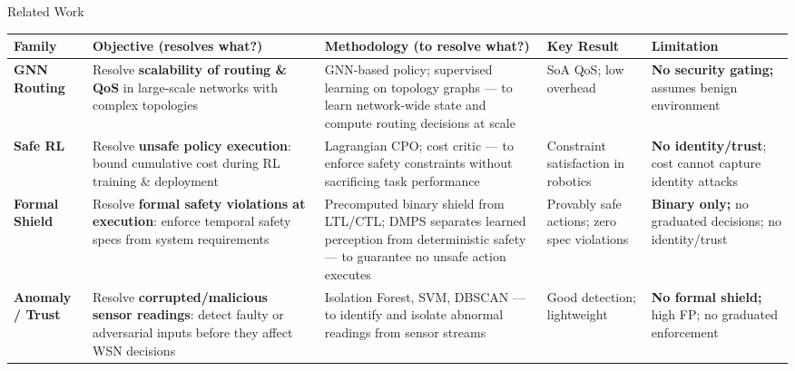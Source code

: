 \documentclass[aspectratio=169,10pt]{beamer}
\begin{document}
\begin{frame}[t,shrink=30]{Related Work}{}
  \centering
  \scriptsize
  \renewcommand{\arraystretch}{1.2}
  \begin{tabular}{p{1.8cm}|p{2.8cm}|p{2.8cm}|p{1.7cm}|p{2.0cm}}
    \toprule
    \textbf{Family} & \textbf{Objective} (resolves what?) & \textbf{Methodology} (to resolve what?) & \textbf{Key Result} & \textbf{Limitation} \\
    \midrule
    \textbf{GNN Routing} \newline \cite{almasan2022deep,rusek2020routenet}
      & Resolve \textbf{scalability of routing \& QoS} in large-scale networks with complex topologies
      & GNN-based policy; supervised learning on topology graphs — to learn network-wide state and compute routing decisions at scale
      & SoA QoS; low overhead
      & \textbf{No security gating;} assumes benign environment \\
    \midrule
    \textbf{Safe RL} \newline \cite{achiam2017cpo,garcia2015saferl}
      & Resolve \textbf{unsafe policy execution}: bound cumulative cost during RL training \& deployment
      & Lagrangian CPO; cost critic — to enforce safety constraints without sacrificing task performance
      & Constraint satisfaction in robotics
      & \textbf{No identity/trust}; cost cannot capture identity attacks \\
    \midrule
    \textbf{Formal Shield} \newline \cite{alshiekh2018shielding,roderick2024dmps}
      & Resolve \textbf{formal safety violations at execution}: enforce temporal safety specs from system requirements
      & Precomputed binary shield from LTL/CTL; DMPS separates learned perception from deterministic safety — to guarantee no unsafe action executes
      & Provably safe actions; zero spec violations
      & \textbf{Binary only;} no graduated decisions; no identity/trust \\
    \midrule
    \textbf{Anomaly / Trust} \newline \cite{zahoor2025ifocsvm,haque2023dbscanwsn}
      & Resolve \textbf{corrupted/malicious sensor readings}: detect faulty or adversarial inputs before they affect WSN decisions
      & Isolation Forest, SVM, DBSCAN — to identify and isolate abnormal readings from sensor streams
      & Good detection; lightweight
      & \textbf{No formal shield;} high FP; no graduated enforcement \\

\end{tabular}
\end{frame}
\end{document}
